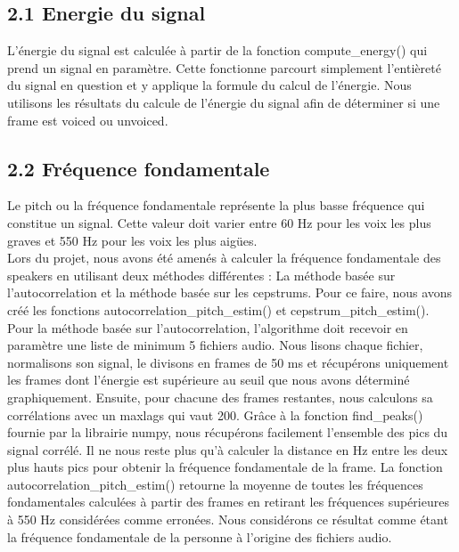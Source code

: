 \documentclass[a4paper,12pt]{report}	%
\begin{document}
{\subsection*{2.1 Energie du signal}}
L'énergie du signal est calculée à partir de la fonction compute\_energy() qui prend un signal en paramètre. Cette fonctionne parcourt simplement l'entièreté du signal en question et y applique la formule du calcul de l'énergie. Nous utilisons les résultats du calcule de l'énergie du signal afin de déterminer si une frame est voiced ou unvoiced.
{\subsection*{2.2 Fréquence fondamentale}}
Le pitch ou la fréquence fondamentale représente la plus basse fréquence qui constitue un signal. Cette valeur doit varier entre 60 Hz pour les voix les plus graves et 550 Hz pour les voix les plus aigües. \\
Lors du projet, nous avons été amenés à calculer la fréquence fondamentale des speakers en utilisant deux méthodes différentes : La méthode basée sur l'autocorrelation et la méthode basée sur les cepstrums. Pour ce faire, nous avons créé les fonctions autocorrelation\_pitch\_estim() et cepstrum\_pitch\_estim(). \\
Pour la méthode basée sur l'autocorrelation, l'algorithme doit recevoir en paramètre une liste de minimum 5 fichiers audio. Nous lisons chaque fichier, normalisons son signal, le divisons en frames de 50 ms et récupérons uniquement les frames dont l'énergie est supérieure au seuil que nous avons déterminé graphiquement. Ensuite, pour chacune des frames restantes, nous calculons sa corrélations avec un maxlags qui vaut 200. Grâce à la fonction find\_peaks() fournie par la librairie numpy, nous récupérons facilement l'ensemble des pics du signal corrélé. Il ne nous reste plus qu'à calculer la distance en Hz entre les deux plus hauts pics pour obtenir la fréquence fondamentale de la frame. La fonction autocorrelation\_pitch\_estim() retourne la moyenne de toutes les fréquences fondamentales calculées à partir des frames en retirant les fréquences supérieures à 550 Hz considérées comme erronées. Nous considérons ce résultat comme étant la fréquence fondamentale de la personne à l'origine des fichiers audio. \\
\end{document}
